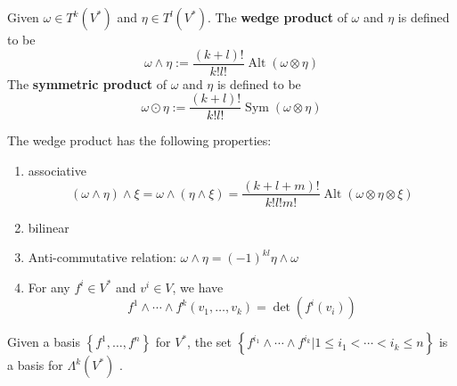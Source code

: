 \documentclass[12pt, oneside]{book}
\begin{document}
\begin{definition}
    Given $\omega \in T^k(V^*)$ and $\eta  \in T^l(V^*)$.
    The \textbf{wedge product} of $\omega $ and $\eta  $ is defined to be
    \begin{equation*}
        \omega \wedge \eta
        :=
        \frac{(k+l)!}{k!l!} \operatorname{Alt}(\omega \otimes \eta)
    \end{equation*}
    The \textbf{symmetric product} of $\omega $ and $\eta $ is defined to be
    \begin{equation*}
        \omega \odot \eta
        :=
        \frac{(k+l)!}{k!l!} \operatorname{Sym}(\omega \otimes \eta)
    \end{equation*}
\end{definition}
\begin{proposition}
    The wedge product has the following properties:
    \begin{enumerate}
        \item associative
              \begin{equation*}
                  (\omega \wedge \eta) \wedge \xi
                  =
                  \omega \wedge(\eta \wedge \xi)
                  =
                  \frac{(k+l+m)!}{k!l!m!} \operatorname{Alt}(\omega \otimes \eta \otimes \xi)
              \end{equation*}
        \item bilinear
        \item  Anti-commutative relation: $\omega \wedge \eta=(-1)^{k l} \eta \wedge \omega$
        \item For any $f^i \in V^*$ and $v^i \in V$, we have
              \begin{equation*}
                  f^1 \wedge \cdots \wedge f^k\left(v_1, \ldots, v_k\right)
                  =
                  \operatorname{det}
                  \left(f^i(v_i)\right)
              \end{equation*}
    \end{enumerate}
\end{proposition}

\begin{corollary}
    Given a basis $\left\{f^1, \ldots, f^n\right\}$ for $V^*$, the set $\left\{f^{i_1}\wedge \cdots \wedge f^{i_k}  | 1 \leq i_1 < \cdots < i_k \leq n\right\}$ is a basis for $\Lambda^k(V^*)$ .
\end{corollary}
\end{document}
